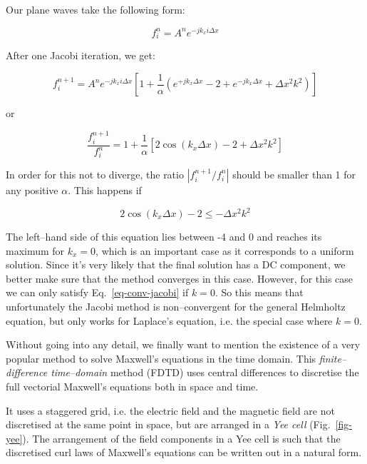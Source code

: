 Our plane waves take the following form:

\begin{equation}
f_i^n = A^n e^{-j k_x i \Delta x}
\end{equation} 

After one Jacobi iteration, we get:

\begin{equation}
f_i^{n+1} = A^n e^{-j k_x i \Delta x} \left[{ 1 + \frac{1}{\alpha}\left(e^{+ j k_x  \Delta x} - 2+  e^{-j k_x  \Delta x} + \Delta x^2 k^2\right)}\right]
\end{equation} 

or

\begin{equation}
\frac{f_i^{n+1}}{f_i^{n}} =  1 + \frac{1}{\alpha}\left[2 \cos ( k_x  \Delta x) - 2 + \Delta x^2 k^2\right]
\end{equation} 

In order for this not to diverge, the ratio  $|f_i^{n+1} / f_i^{n}|$ should be smaller than 1 for any positive $\alpha$. This happens if

\begin{equation}
2 \cos ( k_x  \Delta x) - 2 \le - \Delta x^2 k^2 \label{eq-conv-jacobi}
\end{equation} 

The left--hand side of this equation lies between -4 and 0 and reaches its maximum for $k_x=0$, which is an important case as it corresponds to a uniform solution. Since it's very likely that the final solution has a DC component, we better make sure that the method converges in this case. However, for this case we can only satisfy Eq.~\ref{eq-conv-jacobi} if $k=0$. So this means that unfortunately the Jacobi method is non--convergent for the general Helmholtz equation, but only works for Laplace's equation, i.e. the special case where $k=0$.

\pagebreak


Without going into any detail, we finally want to mention the existence of a very popular method to solve Maxwell's equations in the time domain. This \emph{finite--difference time--domain} method (FDTD) uses central differences to discretise the full vectorial Maxwell's equations both in space and time.

It uses a staggered grid, i.e. the electric field and the magnetic field are not discretised at the same point in space, but are arranged in a \emph{Yee cell} (Fig.~\ref{fig-yee}). The arrangement of the field components in a Yee cell is such that the discretised curl laws of Maxwell's equations can be written out in a natural form.

